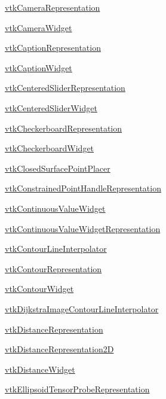 \begin{DoxyItemize}
\item \hyperlink{vtkwidgets_vtkcamerarepresentation}{vtk\-Camera\-Representation}  
\item \hyperlink{vtkwidgets_vtkcamerawidget}{vtk\-Camera\-Widget}  
\item \hyperlink{vtkwidgets_vtkcaptionrepresentation}{vtk\-Caption\-Representation}  
\item \hyperlink{vtkwidgets_vtkcaptionwidget}{vtk\-Caption\-Widget}  
\item \hyperlink{vtkwidgets_vtkcenteredsliderrepresentation}{vtk\-Centered\-Slider\-Representation}  
\item \hyperlink{vtkwidgets_vtkcenteredsliderwidget}{vtk\-Centered\-Slider\-Widget}  
\item \hyperlink{vtkwidgets_vtkcheckerboardrepresentation}{vtk\-Checkerboard\-Representation}  
\item \hyperlink{vtkwidgets_vtkcheckerboardwidget}{vtk\-Checkerboard\-Widget}  
\item \hyperlink{vtkwidgets_vtkclosedsurfacepointplacer}{vtk\-Closed\-Surface\-Point\-Placer}  
\item \hyperlink{vtkwidgets_vtkconstrainedpointhandlerepresentation}{vtk\-Constrained\-Point\-Handle\-Representation}  
\item \hyperlink{vtkwidgets_vtkcontinuousvaluewidget}{vtk\-Continuous\-Value\-Widget}  
\item \hyperlink{vtkwidgets_vtkcontinuousvaluewidgetrepresentation}{vtk\-Continuous\-Value\-Widget\-Representation}  
\item \hyperlink{vtkwidgets_vtkcontourlineinterpolator}{vtk\-Contour\-Line\-Interpolator}  
\item \hyperlink{vtkwidgets_vtkcontourrepresentation}{vtk\-Contour\-Representation}  
\item \hyperlink{vtkwidgets_vtkcontourwidget}{vtk\-Contour\-Widget}  
\item \hyperlink{vtkwidgets_vtkdijkstraimagecontourlineinterpolator}{vtk\-Dijkstra\-Image\-Contour\-Line\-Interpolator}  
\item \hyperlink{vtkwidgets_vtkdistancerepresentation}{vtk\-Distance\-Representation}  
\item \hyperlink{vtkwidgets_vtkdistancerepresentation2d}{vtk\-Distance\-Representation2\-D}  
\item \hyperlink{vtkwidgets_vtkdistancewidget}{vtk\-Distance\-Widget}  
\item \hyperlink{vtkwidgets_vtkellipsoidtensorproberepresentation}{vtk\-Ellipsoid\-Tensor\-Probe\-Representation}  

\end{DoxyItemize}
